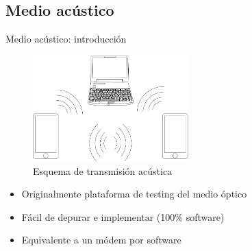 \documentclass[aspectratio=169]{beamer}
\begin{document}
\subsection{Medio acústico}

\begin{frame}{Medio acústico: introducción}

\begin{figure}[t]
  \centering  
    \includegraphics[width=6cm]{graphs/compucelus}
    \vspace{0.5cm}
    \\ Esquema de transmisión acústica
    \label{ios_process_mem}
\end{figure}

\begin{itemize}
 \item Originalmente plataforma de testing del medio óptico
 \item Fácil de depurar e implementar (100\% software)
 \item Equivalente a un módem por software
\end{itemize}

\end{frame}
\end{document}

